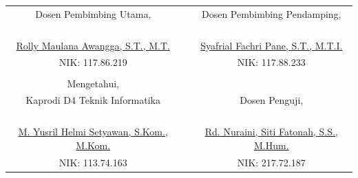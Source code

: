 \begin{pengesahan}
\begin{table}[h]
	\begin{tabular}{ccc}
		Dosen Pembimbing Utama,                  &                      & Dosen Pembimbing Pendamping,       \\
		&                      &                                    \\
		&                      &                                    \\
		&                      &                                    \\
		&                      &                                    \\
		\underline{Rolly Maulana Awangga, S.T., M.T.}        &                      & \underline{Syafrial Fachri Pane, S.T., M.T.I.} \\
		NIK: 117.86.219                          &                      & NIK: 117.88.233                    \\
		\multicolumn{1}{l}{}                     & \multicolumn{1}{l}{} & \multicolumn{1}{l}{}               \\
		Mengetahui,                              &                      &                                    \\
		Kaprodi D4 Teknik Informatika            &                      & Dosen Penguji,                     \\
		&                      &                                    \\
		&                      &                                    \\
		&                      &                                    \\
		&                      &                                    \\
		\underline{M. Yusril Helmi Setyawan, S.Kom., M.Kom.} &                      & \underline{Rd. Nuraini, Siti Fatonah, S.S., M.Hum.}    \\
		NIK: 113.74.163                          &                      & NIK: 217.72.187                   
	\end{tabular}
\end{table}

\end{pengesahan}
